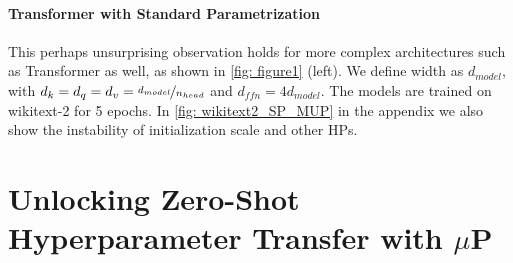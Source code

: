 \documentclass{article}
\theoremstyle{definition}
\begin{document}
\paragraph{Transformer with Standard Parametrization}
This perhaps unsurprising observation holds for more complex architectures such as Transformer as well, as shown in \cref{fig: figure1} (left).
We define width as $d_{model}$, with $d_{k}=d_{q}=d_{v}=\nicefrac{d_{model}}{n_{head}}$ and $d_{ffn}=4  d_{model}$.
The models are trained on wikitext-2 for 5 epochs.
In \cref{fig: wikitext2_SP_MUP} in the appendix we also show the instability of initialization scale and other HPs.

\section{Unlocking Zero-Shot Hyperparameter Transfer with \texorpdfstring{$\mu$P}{muP}}
\label{sec:mutransfer}
\end{document}
